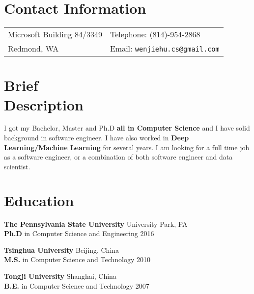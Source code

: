 \documentclass[margin,line]{res}
\begin{document}

\begin{resume}
\section{\sc Contact Information}
\vspace{.05in}
\begin{tabular}{@{}p{3.5in}p{2.3in}}
Microsoft Building 84/3349   & \hfill  Telephone: (814)-954-2868\\
Redmond, WA  & \hfill Email: \texttt{wenjiehu.cs@gmail.com}
\end{tabular}


\section{\sc Brief\\ Description}
I got my Bachelor, Master and Ph.D {\bf all in Computer Science} and I have solid background in software engineer. I have also worked in {\bf Deep Learning/Machine Learning} for several years. I am looking for a full time job as a software engineer, or a combination of both software engineer and data scientist.

\section{\sc Education}

{\bf The Pennsylvania State University}  \hfill  University Park, PA\\
{ {\bf Ph.D} in Computer Science and Engineering} \hfill 2016 \\
\vspace{-0.25in}

{\bf Tsinghua University} \hfill Beijing, China\\
{{\bf M.S.} in Computer Science and Technology} \hfill 2010\\
\vspace{-0.25in}

{\bf Tongji University} \hfill Shanghai, China \\
{{\bf B.E.} in Computer Science and Technology} \hfill 2007
\vspace{-0.1in}


\end{resume}
\end{document}
